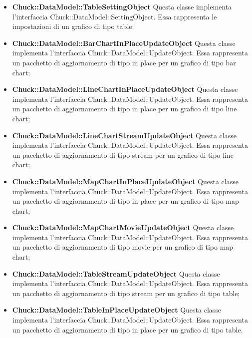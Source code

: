 \begin{itemize}
		\item \textbf{Chuck::DataModel::TableSettingObject} Questa classe implementa l'interfaccia \linebreak Chuck::DataModel::SettingObject. Essa rappresenta le impostazioni di un grafico di tipo table;

		\item \textbf{Chuck::DataModel::BarChartInPlaceUpdateObject} Questa classe implementa l'interfaccia Chuck::DataModel::UpdateObject. Essa rappresenta un pacchetto di aggiornamento di tipo in place per un grafico di tipo bar chart;

		\item \textbf{Chuck::DataModel::LineChartInPlaceUpdateObject} Questa classe implementa l'interfaccia Chuck::DataModel::UpdateObject. Essa rappresenta un pacchetto di aggiornamento di tipo in place per un grafico di tipo line chart;

		\item \textbf{Chuck::DataModel::LineChartStreamUpdateObject} Questa classe implementa l'interfaccia Chuck::DataModel::UpdateObject. Essa rappresenta un pacchetto di aggiornamento di tipo stream per un grafico di tipo line chart;

		\item \textbf{Chuck::DataModel::MapChartInPlaceUpdateObject} Questa classe implementa l'interfaccia Chuck::DataModel::UpdateObject. Essa rappresenta un pacchetto di aggiornamento di tipo in place per un grafico di tipo map chart;

		\item \textbf{Chuck::DataModel::MapChartMovieUpdateObject} Questa classe implementa l'interfaccia Chuck::DataModel::UpdateObject. Essa rappresenta un pacchetto di aggiornamento di tipo movie per un grafico di tipo map chart;

		\item \textbf{Chuck::DataModel::TableStreamUpdateObject} Questa classe implementa l'interfaccia Chuck::DataModel::UpdateObject. Essa rappresenta un pacchetto di aggiornamento di tipo stream per un grafico di tipo table;

		\item \textbf{Chuck::DataModel::TableInPlaceUpdateObject} Questa classe implementa l'interfaccia Chuck::DataModel::UpdateObject. Essa rappresenta un pacchetto di aggiornamento di tipo in place per un grafico di tipo table.
	\end{itemize}